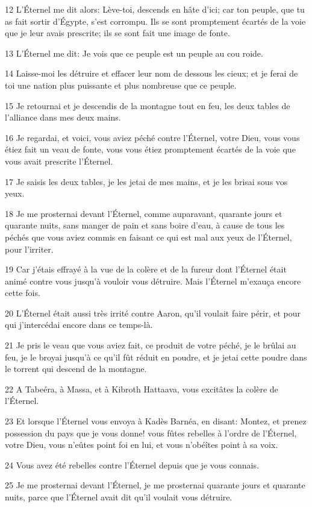 \par 12 L'Éternel me dit alors: Lève-toi, descends en hâte d'ici; car ton peuple, que tu as fait sortir d'Égypte, s'est corrompu. Ils se sont promptement écartés de la voie que je leur avais prescrite; ils se sont fait une image de fonte.
\par 13 L'Éternel me dit: Je vois que ce peuple est un peuple au cou roide.
\par 14 Laisse-moi les détruire et effacer leur nom de dessous les cieux; et je ferai de toi une nation plus puissante et plus nombreuse que ce peuple.
\par 15 Je retournai et je descendis de la montagne tout en feu, les deux tables de l'alliance dans mes deux mains.
\par 16 Je regardai, et voici, vous aviez péché contre l'Éternel, votre Dieu, vous vous étiez fait un veau de fonte, vous vous étiez promptement écartés de la voie que vous avait prescrite l'Éternel.
\par 17 Je saisis les deux tables, je les jetai de mes mains, et je les brisai sous vos yeux.
\par 18 Je me prosternai devant l'Éternel, comme auparavant, quarante jours et quarante nuits, sans manger de pain et sans boire d'eau, à cause de tous les péchés que vous aviez commis en faisant ce qui est mal aux yeux de l'Éternel, pour l'irriter.
\par 19 Car j'étais effrayé à la vue de la colère et de la fureur dont l'Éternel était animé contre vous jusqu'à vouloir vous détruire. Mais l'Éternel m'exauça encore cette fois.
\par 20 L'Éternel était aussi très irrité contre Aaron, qu'il voulait faire périr, et pour qui j'intercédai encore dans ce temps-là.
\par 21 Je pris le veau que vous aviez fait, ce produit de votre péché, je le brûlai au feu, je le broyai jusqu'à ce qu'il fût réduit en poudre, et je jetai cette poudre dans le torrent qui descend de la montagne.
\par 22 A Tabeéra, à Massa, et à Kibroth Hattaava, vous excitâtes la colère de l'Éternel.
\par 23 Et lorsque l'Éternel vous envoya à Kadès Barnéa, en disant: Montez, et prenez possession du pays que je vous donne! vous fûtes rebelles à l'ordre de l'Éternel, votre Dieu, vous n'eûtes point foi en lui, et vous n'obéîtes point à sa voix.
\par 24 Vous avez été rebelles contre l'Éternel depuis que je vous connais.
\par 25 Je me prosternai devant l'Éternel, je me prosternai quarante jours et quarante nuits, parce que l'Éternel avait dit qu'il voulait vous détruire.
